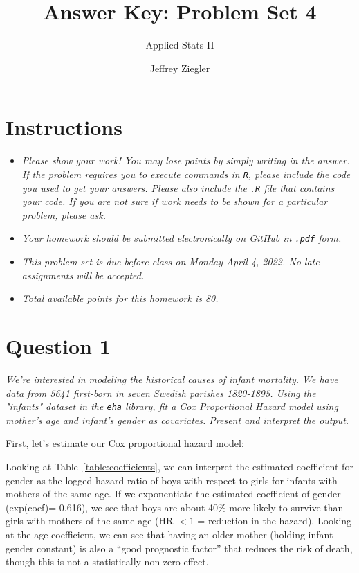 \documentclass[12pt,letterpaper]{article}
\title{Answer Key: Problem Set 4}
\date{Jeffrey Ziegler}
\author{Applied Stats II}
\begin{document}
	\maketitle
	
	\section*{Instructions}
	\begin{itemize}
		\item \textit{Please show your work! You may lose points by simply writing in the answer. If the problem requires you to execute commands in \texttt{R}, please include the code you used to get your answers. Please also include the \texttt{.R} file that contains your code. If you are not sure if work needs to be shown for a particular problem, please ask.}
		\item \textit{Your homework should be submitted electronically on GitHub in \texttt{.pdf} form.}
		\item \textit{This problem set is due before class on Monday April 4, 2022. No late assignments will be accepted.}
		\item \textit{Total available points for this homework is 80.}
	\end{itemize}
	\vspace{.25cm}
	
	\section*{Question 1}
	\vspace{.25cm}
	\noindent \emph{We're interested in modeling the historical causes of infant mortality. We have data from 5641 first-born in seven Swedish parishes 1820-1895. Using the "infants" dataset in the \texttt{eha} library, fit a Cox Proportional Hazard model using mother's age and infant's gender as covariates. Present and interpret the output.}
	
	First, let's estimate our Cox proportional hazard model:
	
	 
	
	
	\noindent Looking at Table~\ref{table:coefficients}, we can interpret the estimated coefficient for gender as the logged hazard ratio of boys with respect to girls for infants with mothers of the same age. If we exponentiate the estimated coefficient of gender (exp(coef)= 0.616), we see that boys are about 40\% more likely to survive than girls with mothers of the same age (HR $< 1$ = reduction in the hazard). Looking at the age coefficient, we can see that having an older mother (holding infant gender constant) is also a “good prognostic factor” that reduces the risk of death, though this is not a statistically non-zero effect.
	
\end{document}
